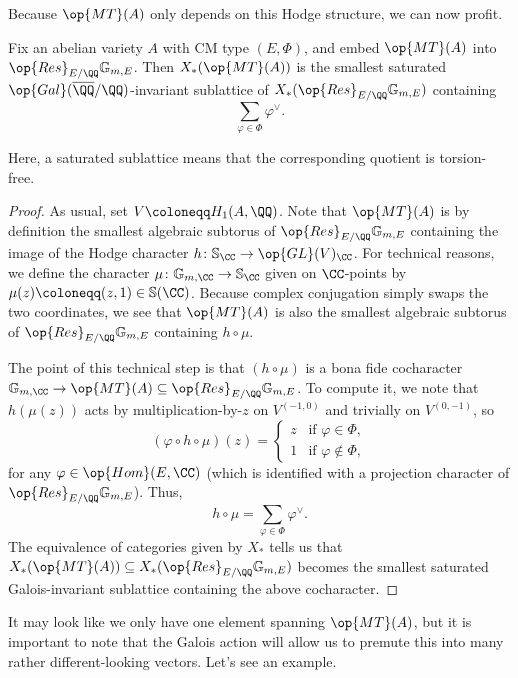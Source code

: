 \documentclass{article}
\begin{document}
Because $\op{MT}(A)$ only depends on this Hodge structure, we can now profit.
\begin{proposition} \label{prop:cm-type-to-mt}
	Fix an abelian variety $A$ with CM type $(E,\Phi)$, and embed $\op{MT}(A)$ into $\op{Res}_{E/\QQ}\mathbb G_{m,E}$. Then $X_*(\op{MT}(A))$ is the smallest saturated $\op{Gal}(\overline\QQ/\QQ)$-invariant sublattice of $X_*(\op{Res}_{E/\QQ}\mathbb G_{m,E})$ containing
	\[\sum_{\varphi\in\Phi}\varphi^\lor.\]
\end{proposition}
Here, a saturated sublattice means that the corresponding quotient is torsion-free.
\begin{proof}
	As usual, set $V\coloneqq H_1(A,\QQ)$. Note that $\op{MT}(A)$ is by definition the smallest algebraic subtorus of $\op{Res}_{E/\QQ}\mathbb G_{m,E}$ containing the image of the Hodge character $h\colon\mathbb S_\CC\to\op{GL}(V)_\CC$. For technical reasons, we define the character $\mu\colon\mathbb G_{m,\CC}\to\mathbb S_\CC$ given on $\CC$-points by $\mu(z)\coloneqq(z,1)\in\mathbb S(\CC)$. Because complex conjugation simply swaps the two coordinates, we see that $\op{MT}(A)$ is also the smallest algebraic subtorus of $\op{Res}_{E/\QQ}\mathbb G_{m,E}$ containing $h\circ\mu$.

	The point of this technical step is that $(h\circ\mu)$ is a bona fide cocharacter $\mathbb G_{m,\CC}\to\op{MT}(A)\subseteq\op{Res}_{E/\QQ}\mathbb G_{m,E}$. To compute it, we note that $h(\mu(z))$ acts by multiplication-by-$z$ on $V^{(-1,0)}$ and trivially on $V^{(0,-1)}$, so
	\[(\varphi\circ h\circ\mu)(z)=\begin{cases}
		z & \text{if }\varphi\in\Phi, \\
		1 & \text{if }\varphi\notin\Phi,
	\end{cases}\]
	for any $\varphi\in\op{Hom}(E,\CC)$ (which is identified with a projection character of $\op{Res}_{E/\QQ}\mathbb G_{m,E}$). Thus,
	\[h\circ\mu=\sum_{\varphi\in\Phi}\varphi^\lor.\]
	The equivalence of categories given by $X_*$ tells us that $X_*(\op{MT}(A))\subseteq X_*(\op{Res}_{E/\QQ}\mathbb G_{m,E})$ becomes the smallest saturated Galois-invariant sublattice containing the above cocharacter.
\end{proof}
It may look like we only have one element spanning $\op{MT}(A)$, but it is important to note that the Galois action will allow us to premute this into many rather different-looking vectors. Let's see an example.
\end{document}
